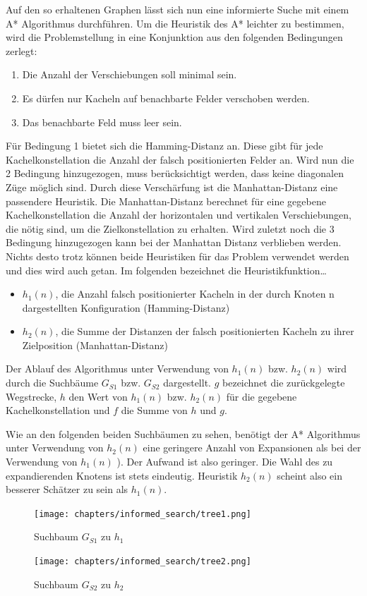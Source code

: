 Auf den so erhaltenen Graphen l\"asst sich nun eine informierte Suche mit einem A* Algorithmus durchf\"uhren. Um die Heuristik des A* leichter zu bestimmen, wird die Problemstellung in eine
Konjunktion aus den folgenden Bedingungen zerlegt:
\begin{enumerate}
	\item Die Anzahl der Verschiebungen soll minimal sein.
	\item Es d\"urfen nur Kacheln auf benachbarte Felder verschoben werden.
	\item Das benachbarte Feld muss leer sein.
\end{enumerate}
F\"ur Bedingung 1 bietet sich die Hamming-Distanz an. Diese gibt f\"ur jede Kachelkonstellation die Anzahl der falsch positionierten Felder an. Wird nun die 2 Bedingung hinzugezogen, muss ber\"ucksichtigt werden, dass keine diagonalen Z\"uge m\"oglich sind. Durch diese Versch\"arfung ist die Manhattan-Distanz eine passendere Heuristik. Die Manhattan-Distanz berechnet f\"ur eine gegebene Kachelkonstellation die Anzahl der horizontalen und vertikalen Verschiebungen, die n\"otig sind, um die Zielkonstellation zu erhalten. Wird zuletzt noch die 3 Bedingung hinzugezogen kann bei der Manhattan Distanz verblieben werden. Nichts desto trotz k\"onnen beide Heuristiken f\"ur das Problem verwendet werden und dies wird auch getan. Im folgenden bezeichnet die Heuristikfunktion\dots 
\begin{itemize}
	\item $h_{1}(n)$, die Anzahl falsch positionierter Kacheln in der durch Knoten n dargestellten Konfiguration (Hamming-Distanz)
	\item $h_{2}(n)$, die Summe der Distanzen der falsch positionierten Kacheln zu ihrer Zielposition (Manhattan-Distanz)
\end{itemize}
Der Ablauf des Algorithmus unter Verwendung von $h_{1}(n)$ bzw. $h_{2}(n)$ wird durch die Suchb\"aume $G_{S1}$ bzw. $G_{S2}$ dargestellt. $g$ bezeichnet die zur\"uckgelegte Wegstrecke, $h$ den Wert von $h_{1}(n)$ bzw. $h_{2}(n)$ f\"ur die gegebene Kachelkonstellation und $f$ die Summe von $h$ und $g$.

Wie an den folgenden beiden Suchb\"aumen zu sehen, ben\"otigt der A* Algorithmus unter Verwendung von $h_{2}(n)$ eine geringere Anzahl von Expansionen als bei der Verwendung von $h_{1}(n)$ ). Der Aufwand ist also geringer. Die Wahl des zu expandierenden Knotens ist stets eindeutig. Heuristik $h_{2}(n)$ scheint also ein besserer Sch\"atzer zu sein als $h_{1}(n)$. 
\begin{figure}[h!]
	\centering
	\texttt{[image: chapters/informed\_search/tree1.png]}
	\caption{Suchbaum $G_{S1}$ zu $h_{1}$}
\end{figure}
\begin{figure}[h!]
	\centering
	\texttt{[image: chapters/informed\_search/tree2.png]}
	\caption{Suchbaum $G_{S2}$ zu $h_{2}$}
\end{figure} 
